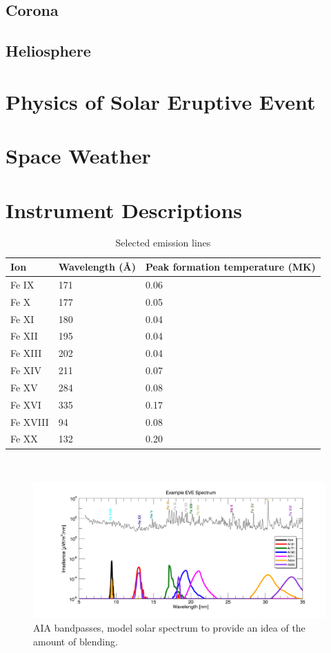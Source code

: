 \subsection{Corona}

\subsection{Heliosphere}

\section{Physics of Solar Eruptive Event}

\section{Space Weather}

\section{Instrument Descriptions}

\begin{table}[!h]
    \caption[Selected emission lines and temperatures]{
    Selected emission lines
    }
    \begin{center}
    \begin{tabular}{|l|l|l|} \hline
	Ion & Wavelength (\AA) & Peak formation temperature (MK) \\ \hline \hline
	Fe IX & 171 & 0.06 \\ \hline
	Fe X & 177 & 0.05  \\ \hline
	Fe XI & 180 & 0.04 \\ \hline
	Fe XII & 195 & 0.04 \\ \hline
	Fe XIII & 202 & 0.04 \\ \hline
	Fe XIV & 211 & 0.07 \\ \hline
	Fe XV & 284 & 0.08 \\ \hline
	Fe XVI & 335 & 0.17 \\ \hline
	Fe XVIII & 94 & 0.08 \\ \hline
	Fe XX & 132 & 0.20 \\ \hline
	\end{tabular}
    \\ \rule{0mm}{5mm}
    \end{center}
    \label{tab:emissionlines}
\end{table}

\begin{figure}[!h]
    \begin{center}
	    \includegraphics[width=166mm]{Images/AiaBandpasses.png}
    \end{center}
    \caption[AIA bandpasses]{
	    AIA bandpasses, model solar spectrum to provide an idea of the amount of blending. 
	}
    \label{aiabandpasses}
\end{figure}